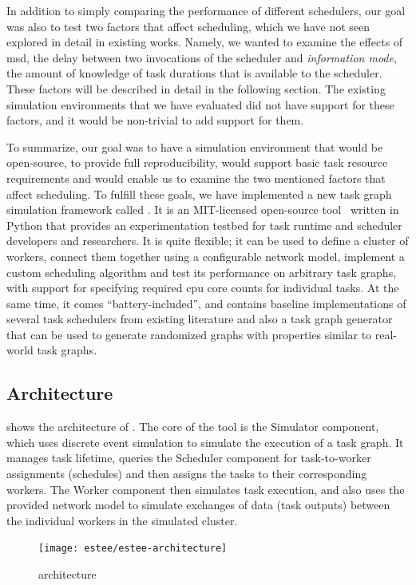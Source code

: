 In addition to simply comparing the performance of different schedulers, our goal was also to test
two factors that affect scheduling, which we have not seen explored in detail in existing works.
Namely, we wanted to examine the effects of \gls{msd}, the delay between two
invocations of the scheduler and \emph{information mode}, the amount of knowledge of task durations
that is available to the scheduler. These factors will be described in detail in the following
section. The existing simulation environments that we have evaluated did not have support for these
factors, and it would be non-trivial to add support for them.

To summarize, our goal was to have a simulation environment that would be open-source, to provide
full reproducibility, would support basic task resource requirements and would enable us to examine
the two mentioned factors that affect scheduling. To fulfill these goals, we have implemented a new
task graph simulation framework called \estee{}. It is an \mbox{MIT-licensed}
open-source tool~\cite{estee_github} written in Python that provides an experimentation testbed
for task runtime and scheduler developers and researchers. It is quite flexible; it can be used to
define a cluster of workers, connect them together using a configurable network model, implement a
custom scheduling algorithm and test its performance on arbitrary task graphs, with support for
specifying required \gls{cpu} core counts for individual tasks. At the same time, it
comes ``battery-included'', and contains baseline implementations of several task schedulers from
existing literature and also a task graph generator that can be used to generate randomized graphs
with properties similar to real-world task graphs.

\subsection{Architecture}
 shows the architecture of \estee{}. The core of the
tool is the Simulator component, which uses discrete event simulation to simulate the execution of
a task graph. It manages task lifetime, queries the Scheduler component for task-to-worker
assignments (schedules) and then assigns the tasks to their corresponding workers. The Worker
component then simulates task execution, and also uses the provided network model to simulate
exchanges of data (task outputs) between the individual workers in the simulated cluster.

\begin{figure}
	\centering
	\texttt{[image: estee/estee-architecture]}
	\caption{\estee{} architecture}
	\label{fig:estee-architecture}
\end{figure}

